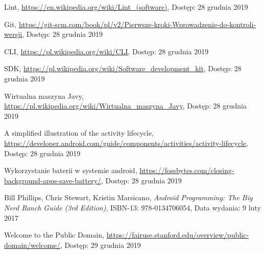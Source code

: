 \documentclass[a4paper,12pt, twoside]{article}
\begin{document}
\begin{thebibliography}{}
    		Lint,
    		\newline\url{https://en.wikipedia.org/wiki/Lint_(software)}, 
    		\newline Dostęp: 28 grudnia 2019
    		
    		Git,
    		\newline\url{https://git-scm.com/book/pl/v2/Pierwsze-kroki-Wprowadzenie-do-kontroli-wersji}, 
    		\newline Dostęp: 28 grudnia 2019
    
    		CLI,
    		\newline\url{https://pl.wikipedia.org/wiki/CLI}, 
    		\newline Dostęp: 28 grudnia 2019
    		
    		SDK,
    		\newline\url{https://pl.wikipedia.org/wiki/Software_development_kit}, 
    		\newline Dostęp: 28 grudnia 2019
    		
    		Wirtualna maszyna Javy,
    		\newline\url{https://pl.wikipedia.org/wiki/Wirtualna_maszyna_Javy}, 
    		\newline Dostęp: 28 grudnia 2019
    		
    		A simplified illustration of the activity lifecycle,
    		\newline\url{https://developer.android.com/guide/components/activities/activity-lifecycle}, 
    		\newline Dostęp: 28 grudnia 2019
    		
    		Wykorzystanie baterii w systemie android,
    		\newline\url{https://fossbytes.com/closing-background-apps-save-battery/}, 
    		\newline Dostęp: 28 grudnia 2019
    		
    	    Bill Phillips, Chris Stewart, Kristin Marsicano, \textit{Android Programming: The Big Nerd Ranch Guide (3rd Edition)}, ISBN-13: 978-0134706054,
    		\newline Data wydania: 9 luty 2017
    		
    		Welcome to the Public Domain,
    		\newline\url{https://fairuse.stanford.edu/overview/public-domain/welcome/}, 
    		\newline Dostęp: 29 grudnia 2019
    		

\end{thebibliography}
\end{document}
